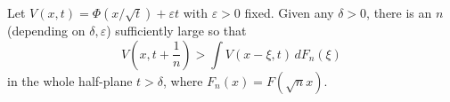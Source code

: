 Let $V(x,t) = \Phi(x/\sqrt{t}) + \varepsilon t$ with $\varepsilon > 0$ fixed. Given any $\delta > 0$, there is an $n$ (depending on $\delta, \varepsilon$) sufficiently large so that
$$V\left(x, t + \frac{1}{n}\right) > \int V(x - \xi, t) \, dF_n(\xi)$$
in the whole half-plane $t > \delta$, where $F_n(x) = F(\sqrt{n}x)$.
